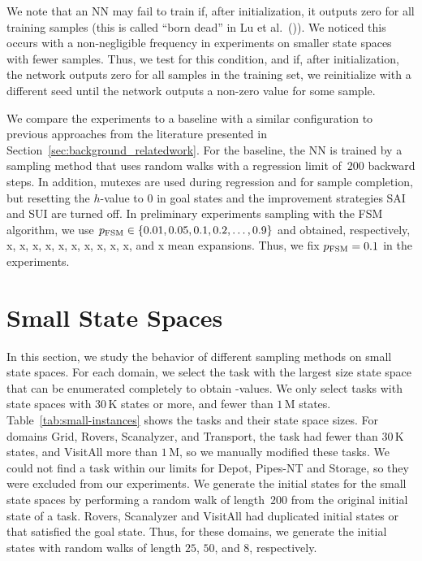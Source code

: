 We note that an NN may fail to train if, after initialization, it outputs zero for all training samples (this is called ``born dead'' in Lu et al.~(\citeyear{Lu.etal/2020})). We noticed this occurs with a non-negligible frequency in experiments on smaller state spaces with fewer samples. Thus, we test for this condition, and if, after initialization, the network outputs zero for all samples in the training set, we reinitialize with a different seed until the network outputs a non-zero value for some sample.

We compare the experiments to a baseline \hnnbase with a similar configuration to previous approaches from the literature presented in Section~\ref{sec:background_relatedwork}. For the baseline, the NN is trained by a sampling method that uses random walks with a regression limit of~$200$ backward steps. In addition, mutexes are used during regression and for sample completion, but resetting the $h$-value to $0$ in goal states and the improvement strategies SAI and SUI are turned off. In preliminary experiments sampling with the FSM algorithm, we use $p_{\text{FSM}}\in\{0.01,0.05,0.1,0.2,\ldots,0.9\}$ and obtained, respectively, x, x, x, x, x, x, x, x, x, x, and x mean expansions. Thus, we fix $p_{\text{FSM}} = 0.1$ in the experiments.

\section{Small State Spaces}
\label{sec:experiment1}

In this section, we study the behavior of different sampling methods on small state spaces. For each domain, we select the task with the largest size state space that can be enumerated completely to obtain \hstar-values. We only select tasks with state spaces with $30$\,K states or more, and fewer than $1$\,M states. Table~\ref{tab:small-instances} shows the tasks and their state space sizes. For domains Grid, Rovers, Scanalyzer, and Transport, the task had fewer than $30$\,K states, and VisitAll more than $1$\,M, so we manually modified these tasks. We could not find a task within our limits for Depot, Pipes-NT and Storage, so they were excluded from our experiments.
We generate the initial states for the small state spaces by performing a random walk of length~$200$ from the original initial state of a task. Rovers, Scanalyzer and VisitAll had duplicated initial states or that satisfied the goal state. Thus, for these domains, we generate the initial states with random walks of length $25$, $50$, and $8$, respectively.

